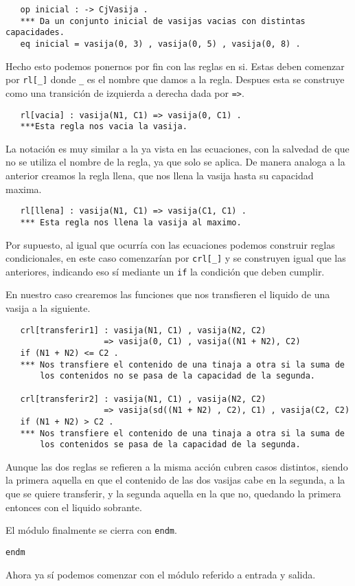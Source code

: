 {\codesize
\begin{verbatim}
   op inicial : -> CjVasija .
   *** Da un conjunto inicial de vasijas vacias con distintas capacidades.
   eq inicial = vasija(0, 3) , vasija(0, 5) , vasija(0, 8) .
\end{verbatim}
}

Hecho esto podemos ponernos por fin con las reglas en si. Estas deben comenzar por \verb"rl[_]" donde \verb"_" es el nombre que damos a la regla. Despues esta se construye como una transición de izquierda a derecha dada por \verb"=>".\par

{\codesize
\begin{verbatim}
   rl[vacia] : vasija(N1, C1) => vasija(0, C1) .
   ***Esta regla nos vacia la vasija.
\end{verbatim}
}
La notación es muy similar a la ya vista en las ecuaciones, con la salvedad de que no se utiliza el nombre de la regla, ya que solo se aplica. De manera analoga a la anterior creamos la regla llena, que nos llena la vasija hasta su capacidad maxima.\par
{\codesize
\begin{verbatim}
   rl[llena] : vasija(N1, C1) => vasija(C1, C1) .
   *** Esta regla nos llena la vasija al maximo.
\end{verbatim}
}
Por supuesto, al igual que ocurría con las ecuaciones podemos construir reglas condicionales, en este caso comenzarían por \verb"crl[_]" y se construyen igual que las anteriores, indicando eso sí mediante un \texttt{if} la condición que deben cumplir.\par

En nuestro caso crearemos las funciones que nos transfieren el liquido de una vasija a la siguiente.\par 
{\codesize
\begin{verbatim}
   crl[transferir1] : vasija(N1, C1) , vasija(N2, C2) 
                    => vasija(0, C1) , vasija((N1 + N2), C2) 
   if (N1 + N2) <= C2 .
   *** Nos transfiere el contenido de una tinaja a otra si la suma de 
       los contenidos no se pasa de la capacidad de la segunda.

   crl[transferir2] : vasija(N1, C1) , vasija(N2, C2) 
                    => vasija(sd((N1 + N2) , C2), C1) , vasija(C2, C2)
   if (N1 + N2) > C2 .
   *** Nos transfiere el contenido de una tinaja a otra si la suma de 
       los contenidos se pasa de la capacidad de la segunda.
\end{verbatim}
}
Aunque las dos reglas se refieren a la misma acción cubren casos distintos, siendo la primera aquella en que el contenido de las dos vasijas cabe en la segunda, a la que se quiere transferir, y la segunda aquella en la que no, quedando la primera entonces con el liquido sobrante.\par

El módulo finalmente se cierra con \texttt{endm}.
{\codesize
\begin{verbatim}
endm
\end{verbatim}
}

Ahora ya sí podemos comenzar con el módulo referido a entrada y salida.\par
